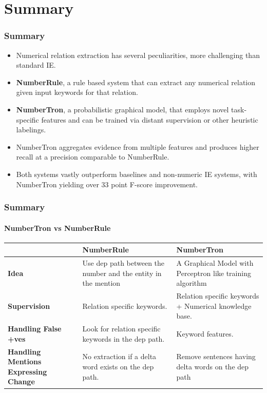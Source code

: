 \documentclass{beamer}
\begin{document}

\section{Summary}
\begin{frame}
\frametitle{Summary}
\begin{itemize} 
\item  Numerical relation extraction has several peculiarities, more challenging than standard IE.
\item \textbf{NumberRule}, a rule based system that can extract any numerical relation given input keywords for that relation.
\item \textbf{NumberTron}, a probabilistic graphical model, that employs novel task-specific features and can be trained via distant supervision or other heuristic labelings. 
\item NumberTron aggregates evidence from multiple features and produces higher recall at a precision comparable to NumberRule. 
\item Both systems vastly outperform baselines and non-numeric IE systems, with NumberTron yielding over 33 point F-score improvement.
\end{itemize}
    
\end{frame}

\begin{frame}
\frametitle{Summary}
\framesubtitle{NumberTron vs NumberRule}
\begin{tabularx}{\textwidth}{|b |b |b |}
\hline
  & \textbf{NumberRule} &  \textbf{NumberTron}\\ \hline
 \textbf{Idea} & Use dep path between the number and the entity in the mention& A Graphical Model with Perceptron like training algorithm\\ \hline
 \textbf{Supervision}& Relation specific keywords. & Relation specific keywords + Numerical knowledge base. \\ \hline
 \textbf{Handling False +ves}&  Look for relation specific keywords in the dep path.&  Keyword features. \\ \hline
\textbf{Handling Mentions Expressing Change}& No extraction if a delta word exists on the dep path. &  Remove sentences having delta words on the dep path\\ \hline 

 \end{tabularx}
\end{frame}
\end{document}
